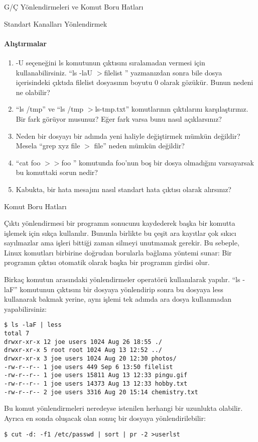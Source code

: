 \begin{section}{G/Ç Yönlendirmeleri ve Komut Boru Hatları}
\begin{subsection}{Standart Kanalları Yönlendirmek}
\paragraph{{\Huge{\PencilLeftDown}}Alıştırmalar}{
\begin{enumerate}
 \item -U seçeneğini ls komutunun çıktısını sıralamadan vermesi için kullanabilirsiniz. “ls -laU $>$filelist ” yazmanızdan sonra bile dosya içerisindeki çıktıda filelist dosyasının boyutu 0 olarak gözükür. Bunun nedeni ne olabilir?
 \item “ls /tmp” ve “ls /tmp $>$ls-tmp.txt” komutlarının çıktılarını karşılaştırınız. Bir fark görüyor musunuz? Eğer fark varsa bunu nasıl açıklarsınız?
 \item Neden bir dosyayı bir adımda yeni haliyle değiştirmek mümkün değildir? Mesela “grep xyz file $>$ file” neden mümkün değildir?
\item “cat foo $>>$foo ” komutunda foo'nun boş bir dosya olmadığını varsayarsak bu komuttaki sorun nedir?
\item Kabukta, bir hata mesajını nasıl standart hata çıktısı olarak alırsınız?
\end{enumerate}}
\end{subsection}
\begin{subsection}{Komut Boru Hatları}

Çıktı yönlendirmesi bir programın sonucunu kaydederek başka bir komutta işlemek için sıkça kullanılır. Bununla birlikte bu çeşit ara kayıtlar çok sıkıcı sayılmazlar ama işleri bittiği zaman silmeyi unutmamak gerekir. Bu sebeple, Linux komutları birbirine doğrudan borularla bağlama yöntemi sunar: Bir programın çıktısı otomatik olarak başka bir programın girdisi olur.

Birkaç komutun arasındaki yönlendirmeler \textbar operatörü kullanılarak yapılır. “ls -laF” komutunun çıktısını bir dosyaya yönlendirip sonra bu dosyaya less kullanarak bakmak yerine, aynı işlemi tek adımda ara dosya kullanmadan yapabilirsiniz:
\begin{verbatim}
$ ls -laF | less
total 7
drwxr-xr-x 12 joe users 1024 Aug 26 18:55 ./
drwxr-xr-x 5 root root 1024 Aug 13 12:52 ../
drwxr-xr-x 3 joe users 1024 Aug 20 12:30 photos/
-rw-r--r-- 1 joe users 449 Sep 6 13:50 filelist
-rw-r--r-- 1 joe users 15811 Aug 13 12:33 pingu.gif
-rw-r--r-- 1 joe users 14373 Aug 13 12:33 hobby.txt
-rw-r--r-- 2 joe users 3316 Aug 20 15:14 chemistry.txt
\end{verbatim}

Bu komut yönlendirmeleri neredeyse istenilen herhangi bir uzunlukta olabilir. Ayrıca en sonda oluşacak olan sonuç bir dosyaya yönlendirilebilir:
\begin{verbatim}
$ cut -d: -f1 /etc/passwd | sort | pr -2 >userlst
\end{verbatim}


\end{subsection}
\end{section}
